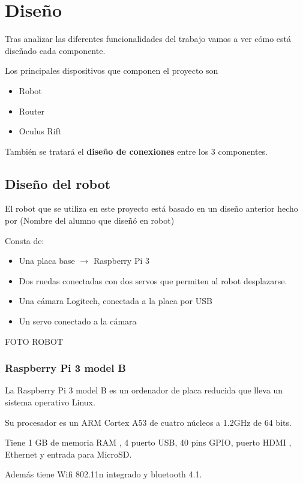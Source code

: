 \documentclass[twoside, 12pt]{epstfg}
\begin{document}
\newpage
\section{Diseño}

Tras analizar las diferentes funcionalidades del trabajo vamos a ver cómo está diseñado cada componente.

Los principales dispositivos que componen el proyecto son 
\begin{itemize}
	\item Robot
	\item Router
	\item Oculus Rift
\end{itemize}

También se tratará el \textbf{diseño de conexiones} entre los 3 componentes.

\subsection{Diseño del robot}

El robot que se utiliza en este proyecto está basado en un diseño anterior hecho por (Nombre del alumno que diseñó en robot)

Consta de:
\begin{itemize}
	\item Una placa base $\rightarrow$ Raspberry Pi 3
	\item Dos ruedas conectadas con dos servos que permiten al robot desplazarse.
	\item Una cámara Logitech, conectada a la placa por USB
	\item Un servo conectado a la cámara 
\end{itemize}


FOTO ROBOT

\subsubsection{Raspberry Pi 3 model B}

La Raspberry Pi 3 model B es un ordenador de placa reducida que lleva un sistema operativo Linux.

Su procesador es un ARM Cortex A53 de cuatro núcleos a 1.2GHz de 64 bits.

Tiene 1 GB de memoria RAM , 4 puerto USB, 40 pins GPIO, puerto HDMI , Ethernet y entrada para MicroSD.

Además tiene Wifi 802.11n integrado y bluetooth 4.1.
\end{document}
